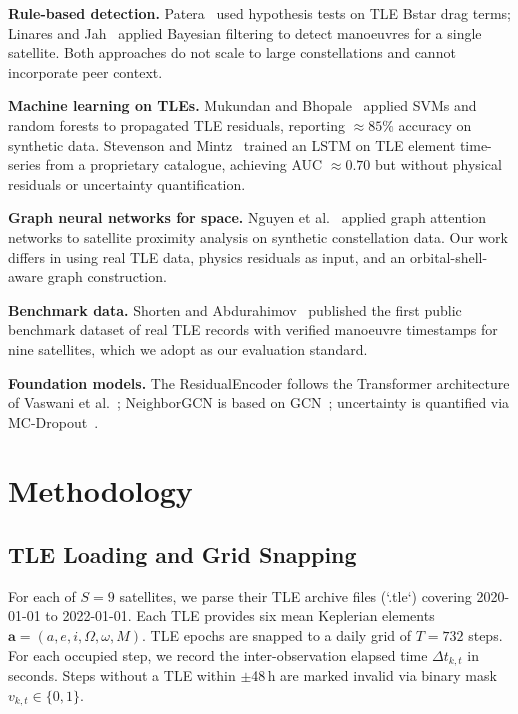 \documentclass[conference]{IEEEtran}
\begin{document}
\textbf{Rule-based detection.} Patera~\cite{patera2008} used
hypothesis tests on TLE Bstar drag terms; Linares and
Jah~\cite{linares2014} applied Bayesian filtering to detect
manoeuvres for a single satellite. Both approaches do not scale to
large constellations and cannot incorporate peer context.

\textbf{Machine learning on TLEs.} Mukundan and
Bhopale~\cite{mukundan2019} applied SVMs and random forests to
propagated TLE residuals, reporting $\approx85\%$ accuracy on
synthetic data. Stevenson and Mintz~\cite{stevenson2022} trained an
LSTM on TLE element time-series from a proprietary catalogue, achieving
AUC $\approx 0.70$ but without physical residuals or uncertainty
quantification.

\textbf{Graph neural networks for space.} Nguyen et
al.~\cite{nguyen2022} applied graph attention networks to satellite
proximity analysis on synthetic constellation data. Our work differs
in using real TLE data, physics residuals as input, and an
orbital-shell-aware graph construction.

\textbf{Benchmark data.} Shorten and
Abdurahimov~\cite{shorten2023} published the first public benchmark
dataset of real TLE records with verified manoeuvre timestamps for nine
satellites, which we adopt as our evaluation standard.

\textbf{Foundation models.} The ResidualEncoder follows the Transformer
architecture of Vaswani et al.~\cite{vaswani2017}; NeighborGCN is
based on GCN~\cite{kipf2017}; uncertainty is quantified via
MC-Dropout~\cite{gal2016}.

\section{Methodology}
\label{sec:method}

\subsection{TLE Loading and Grid Snapping}

For each of $S = 9$ satellites, we parse their TLE archive files
(`.tle`) covering 2020-01-01 to 2022-01-01. Each TLE provides six
mean Keplerian elements $\mathbf{a} = (a, e, i, \Omega, \omega, M)$.
TLE epochs are snapped to a daily grid of $T = 732$ steps. For each
occupied step, we record the inter-observation elapsed time
$\Delta t_{k,t}$ in seconds. Steps without a TLE within $\pm$48\,h
are marked invalid via binary mask $v_{k,t} \in \{0,1\}$.
\end{document}
